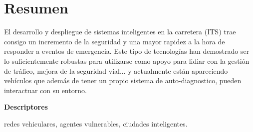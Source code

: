 \chapter*{Resumen}
El desarrollo y despliegue de sistemas inteligentes en la carretera (ITS) trae consigo un incremento de la seguridad y una mayor rapidez a la hora de responder a eventos de emergencia. Este tipo de tecnologías han demostrado ser lo suficientemente robustas para utilizarse como apoyo para lidiar con la gestión de tráfico, mejora de la seguridad vial... y actualmente están apareciendo vehículos que además de tener un propio sistema de auto-diagnostico, pueden interactuar con su entorno.

\vspace{2em}

{\Large\bfseries\sectionfont Descriptores}
\vspace{3\medskipamount}

redes vehiculares, agentes vulnerables, ciudades inteligentes.

\cleardoublepage\tableofcontents
\cleardoublepage\listoffigures
\cleardoublepage\listoftables
\cleardoublepage\listoflistings

\mainmatter
\pagestyle{phdthesis}